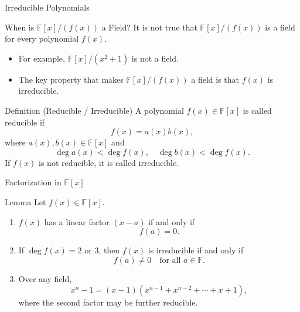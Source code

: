 \documentclass[aspectratio=169,xcolor=dvipsnames]{beamer}
\begin{document}
	\begin{frame}{Irreducible Polynomials}
		
		\begin{alertblock}{When is $\mathbb{F}[x]/(f(x))$ a Field?}
			It is \alert{not} true that $\mathbb{F}[x]/(f(x))$ is a field for every
			polynomial $f(x)$.
			
			\begin{itemize}
				\item For example, $\mathbb{F}[x]/(x^2 + 1)$ is \alert{not} a field.
				\item The key property that makes $\mathbb{F}[x]/(f(x))$ a field
				is that $f(x)$ is \alert{irreducible}.
			\end{itemize}
		\end{alertblock}
		
		\begin{block}{Definition (Reducible / Irreducible)}
			A polynomial $f(x) \in \mathbb{F}[x]$ is called \alert{reducible} if
			\[
			f(x) = a(x)b(x),
			\]
			where $a(x), b(x) \in \mathbb{F}[x]$ and
			\[
			\deg a(x) < \deg f(x), \quad \deg b(x) < \deg f(x).
			\]
			If $f(x)$ is not reducible, it is called \alert{irreducible}.
		\end{block}
		
	\end{frame}
	
	\begin{frame}{Factorization in $\mathbb{F}[x]$}
		
		\vspace{0.6em}
		
		\begin{block}{Lemma}
			Let $f(x) \in \mathbb{F}[x]$.
			\begin{enumerate}
				\item $f(x)$ has a linear factor $(x-a)$ \alert{if and only if}
				\[
				f(a) = 0.
				\]
				
				\item If $\deg f(x) = 2$ or $3$, then $f(x)$ is \alert{irreducible}
				if and only if
				\[
				f(a) \neq 0 \quad \text{for all } a \in \mathbb{F}.
				\]
				
				\item Over any field,
				\[
				x^n - 1 = (x - 1)\left(x^{n-1} + x^{n-2} + \cdots + x + 1\right),
				\]
				where the second factor may be further reducible.
			\end{enumerate}
		\end{block}
		
	\end{frame}
	
\end{document}
